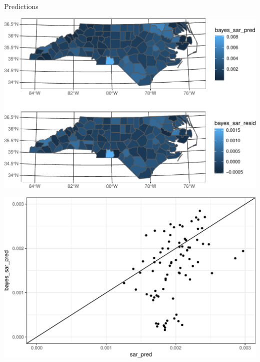 \documentclass[11pt,ignorenonframetext,]{beamer}
\begin{document}
\begin{frame}[t]{Predictions}
\protect\hypertarget{predictions-2}{}

\begin{center}\includegraphics[width=\textwidth]{Lec18_files/figure-beamer/unnamed-chunk-35-1} \end{center}

\end{frame}

\begin{frame}{}
\protect\hypertarget{section-7}{}

\begin{center}\includegraphics[width=\textwidth]{Lec18_files/figure-beamer/unnamed-chunk-36-1} \end{center}

\end{frame}
\end{document}
